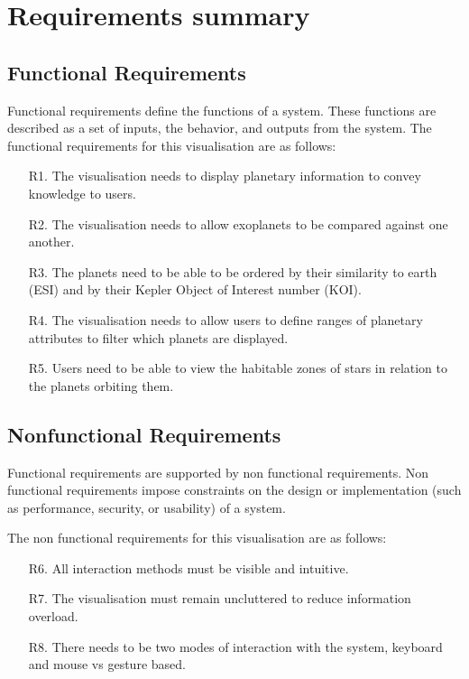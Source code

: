 \section{Requirements summary}
\subsection{Functional Requirements}
Functional requirements define the functions of a system. These functions are
described as a set of inputs, the behavior, and outputs from the system. The functional requirements for this visualisation are as follows:
\begin{enumerate}

 \item[R1.] The visualisation needs to display planetary information to convey knowledge to
users.

 \item[R2.] The visualisation needs to allow exoplanets to be compared against one another.

 \item[R3.] The planets need to be able to be ordered by their similarity to earth (ESI) and by their Kepler Object of Interest number (KOI).
 
 \item[R4.] The visualisation needs to allow users to define ranges of planetary attributes to filter which planets are displayed.

 \item[R5.] Users need to be able to view the habitable zones of stars in relation to the planets orbiting them.

\end{enumerate}

\subsection{Nonfunctional Requirements}
 Functional requirements are supported by non functional requirements. Non
functional requirements impose constraints on the design or implementation (such
as performance, security, or usability) of a system.
 
 The non functional requirements for this visualisation are as follows:
\begin{enumerate}
 \item[R6.] All interaction methods must be visible and intuitive.

 \item[R7.] The visualisation must remain uncluttered to reduce information overload.

 \item[R8.]  There needs to be two modes of interaction with the system, keyboard and mouse vs gesture based.
\end{enumerate}

